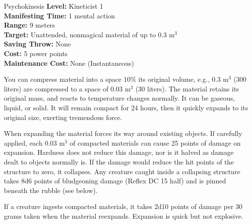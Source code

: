 {Psychokinesis}
{
	\textbf{Level:}
	Kineticist 1\\
	\textbf{Manifesting Time:}
	1 mental action\\
	\textbf{Range:}
	9 meters\\
	\textbf{Target:}
	Unattended, nonmagical material of up to 0.3 m$^3$\\
	\textbf{Saving Throw:}
	None\\
	\textbf{Cost:}
	5 power points\\
	\textbf{Maintenance Cost:}
	None (Instantaneous)\\
}
{
	You can compress material into a space 10\% its original volume, e.g., 0.3 m$^3$ (300 liters) are compressed to a space of 0.03 m$^3$ (30 liters). The material retains its original mass, and reacts to temperature changes normally. It can be gaseous, liquid, or solid. It will remain compact for 24 hours, then it quickly expands to its original size, exerting tremendous force.

	When expanding the material forces its way around existing objects. If carefully applied, each 0.03 m$^3$ of compacted materials can cause 25 points of damage on expansion. Hardness does not reduce this damage, nor is it halved as damage dealt to objects normally is. If the damage would reduce the hit points of the structure to zero, it collapses. Any creature caught inside a collapsing structure takes 8d6 points of bludgeoning damage (Reflex DC 15 half) and is pinned beneath the rubble (see below).

	If a creature ingests compacted materials, it takes 2d10 points of damage per 30 grams taken when the material reexpands. Expansion is quick but not explosive.
}